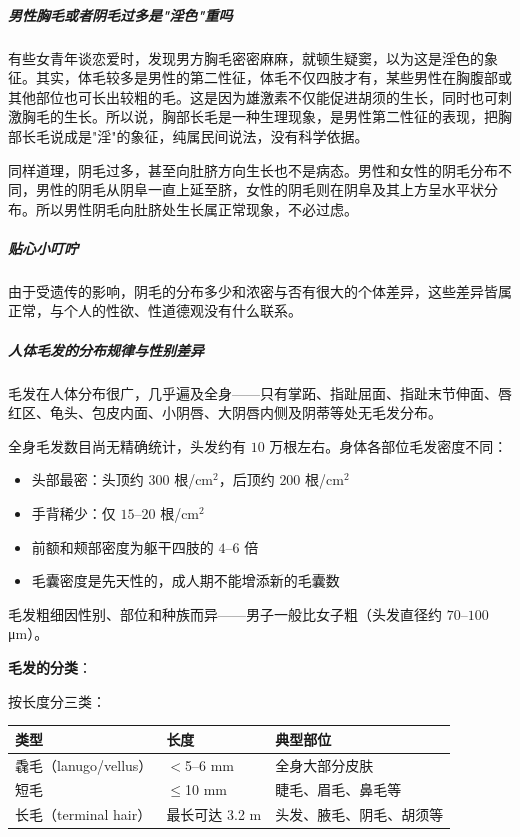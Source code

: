 \subparagraph{男性胸毛或者阴毛过多是"淫色"重吗}

有些女青年谈恋爱时，发现男方胸毛密密麻麻，就顿生疑窦，以为这是淫色的象征。其实，体毛较多是男性的第二性征，体毛不仅四肢才有，某些男性在胸腹部或其他部位也可长出较粗的毛。这是因为雄激素不仅能促进胡须的生长，同时也可刺激胸毛的生长。所以说，胸部长毛是一种生理现象，是男性第二性征的表现，把胸部长毛说成是"淫"的象征，纯属民间说法，没有科学依据。

同样道理，阴毛过多，甚至向肚脐方向生长也不是病态。男性和女性的阴毛分布不同，男性的阴毛从阴阜一直上延至脐，女性的阴毛则在阴阜及其上方呈水平状分布。所以男性阴毛向肚脐处生长属正常现象，不必过虑。

\subparagraph{贴心小叮咛}

由于受遗传的影响，阴毛的分布多少和浓密与否有很大的个体差异，这些差异皆属正常，与个人的性欲、性道德观没有什么联系。

\subparagraph{人体毛发的分布规律与性别差异}

毛发在人体分布很广，几乎遍及全身——只有掌跖、指趾屈面、指趾末节伸面、唇红区、龟头、包皮内面、小阴唇、大阴唇内侧及阴蒂等处无毛发分布。

全身毛发数目尚无精确统计，头发约有 $10$ 万根左右。身体各部位毛发密度不同：
\begin{itemize}
	\item 头部最密：头顶约 $300$ 根/cm$^2$，后顶约 $200$ 根/cm$^2$
	\item 手背稀少：仅 $15$--$20$ 根/cm$^2$
	\item 前额和颊部密度为躯干四肢的 $4$--$6$ 倍
	\item 毛囊密度是先天性的，成人期不能增添新的毛囊数
\end{itemize}

毛发粗细因性别、部位和种族而异——男子一般比女子粗（头发直径约 $70$--$100$ μm）。

\vspace{0.5em}
\noindent\textbf{毛发的分类}：

按长度分三类：
\begin{center}\small
\begin{tabular}{|l|l|p{6cm}|}
\hline
类型 & 长度 & 典型部位 \\
\hline
毳毛（lanugo/vellus） & $<$5--6 mm & 全身大部分皮肤 \\
短毛 & $\leq$10 mm & 睫毛、眉毛、鼻毛等 \\
长毛（terminal hair）& 最长可达 3.2 m & 头发、腋毛、阴毛、胡须等 \\
\hline
\end{tabular}
\end{center}

